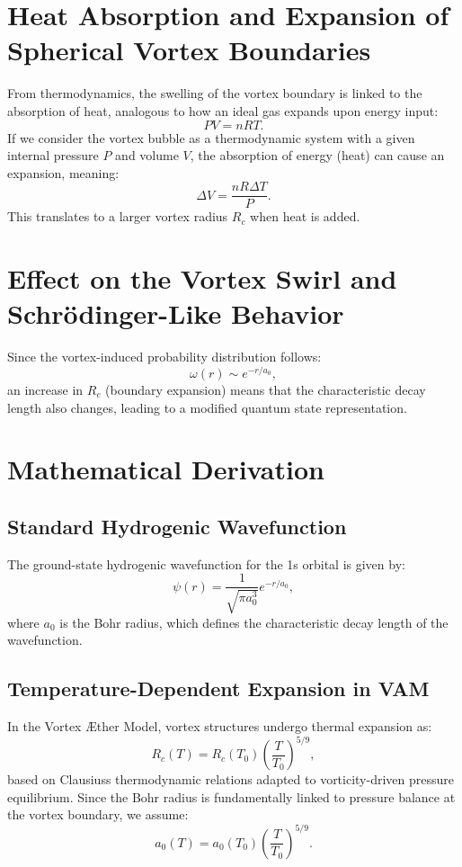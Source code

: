   \section{Heat Absorption and Expansion of Spherical Vortex Boundaries}
  From thermodynamics, the swelling of the vortex boundary is linked to the absorption of heat, analogous to how an ideal gas expands upon energy input:
  \begin{equation*}
    PV = nRT.
  \end{equation*}
  If we consider the vortex bubble as a thermodynamic system with a given internal pressure $P$ and volume $V$, the absorption of energy (heat) can cause an expansion, meaning:
  \begin{equation*}
    \Delta V = \frac{nR \Delta T}{P}.
  \end{equation*}
  This translates to a larger vortex radius $R_c$ when heat is added.

  \section{Effect on the Vortex Swirl and Schr\"{o}dinger-Like Behavior}
  Since the vortex-induced probability distribution follows:
  \begin{equation*}
    \omega(r) \sim e^{-r/a_0},
  \end{equation*}
  an increase in $R_c$ (boundary expansion) means that the characteristic decay length also changes, leading to a modified quantum state representation.

  \section{Mathematical Derivation}
  \subsection{Standard Hydrogenic Wavefunction}
  The ground-state hydrogenic wavefunction for the 1s orbital is given by:
  \begin{equation*}
    \psi(r) = \frac{1}{\sqrt{\pi a_0^3}} e^{-r/a_0},
  \end{equation*}
  where $a_0$ is the Bohr radius, which defines the characteristic decay length of the wavefunction.

  \subsection{Temperature-Dependent Expansion in VAM}
  In the Vortex Æther Model, vortex structures undergo thermal expansion as:
  \begin{equation*}
    R_c(T) = R_c (T_0) \left( \frac{T}{T_0} \right)^{5/9},
  \end{equation*}
  based on Clausius\rqs s thermodynamic relations adapted to vorticity-driven pressure equilibrium. Since the Bohr radius is fundamentally linked to pressure balance at the vortex boundary, we assume:
  \begin{equation*}
    a_0(T) = a_0 (T_0) \left( \frac{T}{T_0} \right)^{5/9}.
  \end{equation*}


